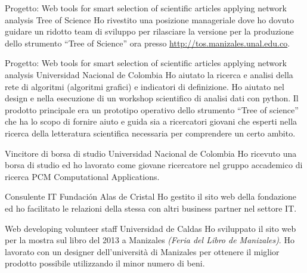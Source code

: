 \documentclass[12pt,english]{moderncv}
\begin{document}
        {Progetto: Web tools for smart selection of scientific articles applying network analysis}
        {Tree of Science}
        {}
        {}
        {%
            Ho rivestito una posizione manageriale dove ho dovuto guidare un ridotto team di sviluppo per rilasciare la versione per la produzione dello strumento ``Tree of Science'' ora presso \url{http://tos.manizales.unal.edu.co}.
        }

        {Progetto: Web tools for smart selection of scientific articles applying network analysis}
        {Universidad Nacional de Colombia}
        {}
        {}
        {%
            Ho aiutato la ricerca e analisi della rete di algoritmi (algoritmi grafici) e indicatori di definizione. 
            Ho aiutato nel design e nella esecuzione di un workshop scientifico di analisi dati con python.
            Il prodotto principale era un prototipo operativo dello strumento ``Tree of science'' che ha lo scopo di fornire aiuto e guida sia a ricercatori giovani che esperti nella ricerca della letteratura scientifica necessaria per comprendere un certo ambito.
        }

        {Vincitore di borsa di studio}
        {Universidad Nacional de Colombia}
        {}
        {}
        {%
            Ho ricevuto una borsa di studio ed ho lavorato come giovane ricercatore nel gruppo accademico di ricerca PCM Computational Applications.
        }

        {Consulente IT}
        {Fundación Alas de Cristal}
        {}
        {}
        {%
            Ho gestito il sito web della fondazione ed ho facilitato le relazioni della stessa con altri business partner nel settore IT.
        }

        {Web developing volunteer staff}
        {Universidad de Caldas}
        {}
        {}
        {%
            Ho sviluppato il sito web per la mostra sul libro del 2013 a Manizales \textit{(Feria del Libro de Manizales)}. Ho lavorato con un designer dell'universit\`a di Manizales per ottenere il miglior prodotto possibile utilizzando il minor numero di beni.
        }
\end{document}

